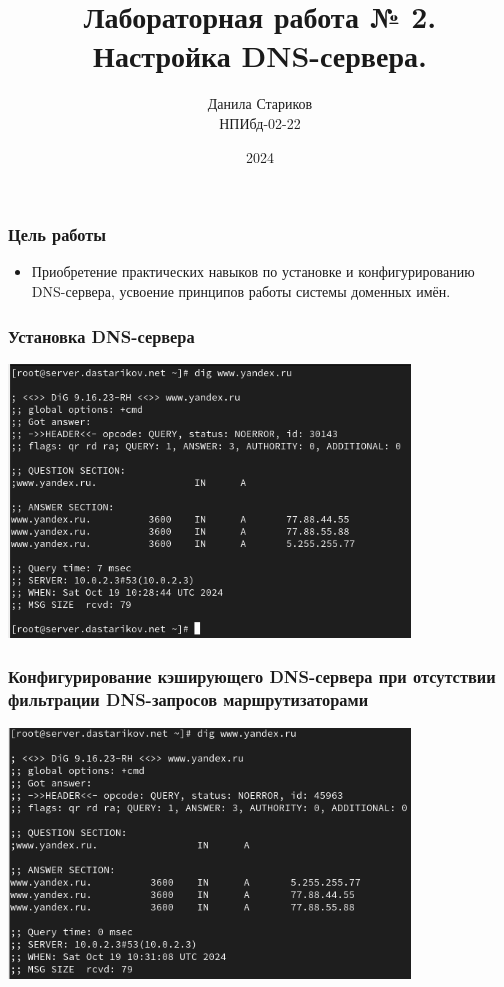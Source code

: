 

\title{Лабораторная работа № 2. \\ Настройка DNS-сервера.}
\author{Данила Стариков \\ НПИбд-02-22}
\date{2024}



\frame{\titlepage}

\begin{frame}
\frametitle{Цель работы}
\begin{itemize}
    \item Приобретение практических навыков по установке и конфигурированию DNS-сервера, усвоение принципов работы системы доменных имён.
\end{itemize}
\end{frame}

\begin{frame}
\frametitle{Установка DNS-сервера}
    \centering
    \includegraphics[width=0.8\textwidth]{../images/image01.png}
\end{frame}

\begin{frame}
\frametitle{Конфигурирование кэширующего DNS-сервера при отсутствии фильтрации DNS-запросов маршрутизаторами}
    \centering
    \includegraphics[width=0.8\textwidth]{../images/image02.png}
\end{frame}


